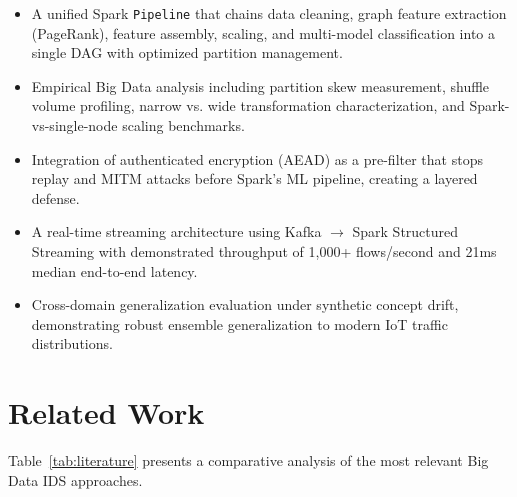 \documentclass[conference]{IEEEtran}
\begin{document}
\begin{itemize}
    \item A unified Spark \texttt{Pipeline} that chains data cleaning, graph feature extraction (PageRank), feature assembly, scaling, and multi-model classification into a single DAG with optimized partition management.
    \item Empirical Big Data analysis including partition skew measurement, shuffle volume profiling, narrow vs. wide transformation characterization, and Spark-vs-single-node scaling benchmarks.
    \item Integration of authenticated encryption (AEAD) as a pre-filter that stops replay and MITM attacks before Spark's ML pipeline, creating a layered defense.
    \item A real-time streaming architecture using Kafka $\rightarrow$ Spark Structured Streaming with demonstrated throughput of 1,000+ flows/second and 21ms median end-to-end latency.
    \item Cross-domain generalization evaluation under synthetic concept drift, demonstrating robust ensemble generalization to modern IoT traffic distributions.
\end{itemize}

\section{Related Work}

Table~\ref{tab:literature} presents a comparative analysis of the most relevant Big Data IDS approaches.
\end{document}

